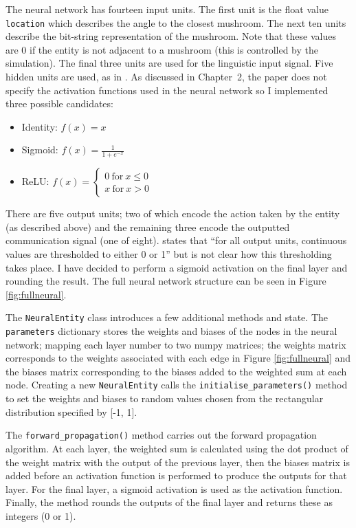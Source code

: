 \documentclass[12pt,a4paper]{report}
\begin{document}
The neural network has fourteen input units. The first unit is the float value \texttt{location} which describes the angle to the closest mushroom. The next ten units describe the bit-string representation of the mushroom. Note that these values are 0 if the entity is not adjacent to a mushroom (this is controlled by the simulation). The final three units are used for the linguistic input signal. Five hidden units are used, as in \citet{Cangelosi1998}. As discussed in Chapter~2, the paper does not specify the activation functions used in the neural network so I implemented three possible candidates:

\begin{itemize}
	\item Identity: $f(x) = x$
	\item Sigmoid: $f(x) = \frac{1}{1+e^{-x}}$
	\item ReLU: $ f(x) = 
    \left\{
        \begin{array}{ll}
          0~\mathrm{for}~x \leq 0 \\
          x~\mathrm{for}~x > 0
        \end{array}
      \right.
      $
\end{itemize}

There are five output units; two of which encode the action taken by the entity (as described above) and the remaining three encode the outputted communication signal (one of eight). \citet{Cangelosi1998} states that ``for all output units, continuous values are thresholded to either 0 or 1'' but is not clear how this thresholding takes place. I have decided to perform a sigmoid activation on the final layer and rounding the result. The full neural network structure can be seen in Figure \ref{fig:fullneural}.

The \texttt{NeuralEntity} class introduces a few additional methods and state. The \texttt{parameters} dictionary stores the weights and biases of the nodes in the neural network; mapping each layer number to two numpy matrices; the weights matrix corresponds to the weights associated with each edge in Figure \ref{fig:fullneural} and the biases matrix corresponding to the biases added to the weighted sum at each node. Creating a new \texttt{NeuralEntity} calls the \texttt{initialise\_parameters()} method to set the weights and biases to random values chosen from the rectangular distribution specified by [-1, 1].

The \texttt{forward\_propagation()} method carries out the forward propagation algorithm. At each layer, the weighted sum is calculated using the dot product of the weight matrix with the output of the previous layer, then the biases matrix is added before an activation function is performed to produce the outputs for that layer. For the final layer, a sigmoid activation is used as the activation function. Finally, the method rounds the outputs of the final layer and returns these as integers (0 or 1).
\end{document}
